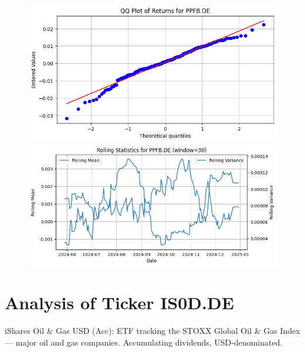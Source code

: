 \documentclass{article}%
\begin{document}
%


\begin{figure}[htbp]%
\begin{minipage}{0.48\textwidth}%
\includegraphics[width=\linewidth]{ticker_images/PPFB.DE_qq_plot.png}%
\end{minipage}%
\begin{minipage}{0.48\textwidth}%
\includegraphics[width=\linewidth]{ticker_images/PPFB.DE_rolling_stats.png}%
\end{minipage}%
\end{figure}

%
\section*{Analysis of Ticker IS0D.DE}%
\label{sec:AnalysisofTickerIS0D.DE}%
iShares Oil \& Gas USD (Acc): ETF tracking the STOXX Global Oil \& Gas Index — major oil and gas companies. Accumulating dividends, USD‑denominated.%
\end{document}
